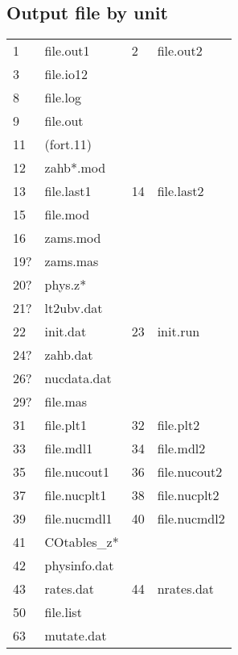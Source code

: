 \subsection{Output file by unit}

\begin{tabular}{llll}
 1 & file.out1    \hspace*{2.cm} &    2 & file.out2    \\
 3 & file.io12    &   &   \\
 8 & file.log     &   &   \\
 9 & file.out     &   &   \\
11 & (fort.11)     &   &   \\
12 & zahb*.mod   &   &   \\
13 & file.last1   &   14 & file.last2   \\
15 & file.mod     &   &   \\
16 & zams.mod     &   &   \\
19? & zams.mas     &   &   \\
20? & phys.z*   &   &   \\
21? & lt2ubv.dat   &   &   \\
22 & init.dat   &   23 & init.run   \\
24? & zahb.dat   &   &   \\
26? & nucdata.dat   &   &   \\
29? & file.mas    &   &   \\
31 & file.plt1    &   32 & file.plt2    \\
33 & file.mdl1    &   34 & file.mdl2    \\
35 & file.nucout1 &   36 & file.nucout2 \\
37 & file.nucplt1 &   38 & file.nucplt2 \\
39 & file.nucmdl1 &   40 & file.nucmdl2 \\
41 & COtables\_z* &   &   \\
42 & physinfo.dat &   &   \\
43 & rates.dat &   44 & nrates.dat \\
50 & file.list &   &   \\
63 & mutate.dat &   &   \\
\end{tabular}
